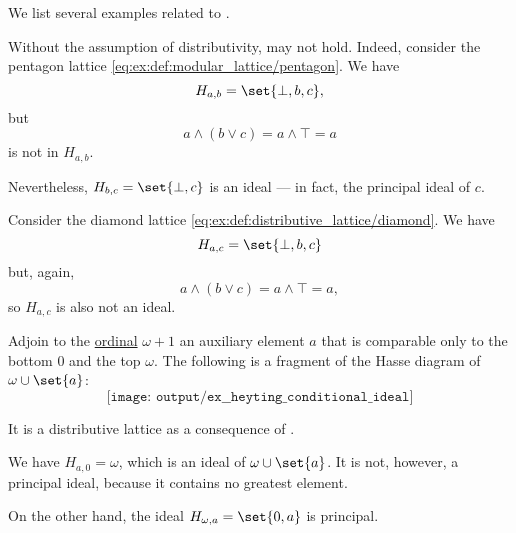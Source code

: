 \begin{example}\label{ex:heyting_conditional_ideal}
  We list several examples related to .

  \begin{thmenum}
     Without the assumption of distributivity,  may not hold. Indeed, consider the pentagon lattice \eqref{eq:ex:def:modular_lattice/pentagon}. We have
    \begin{equation*}
      H_{a,b} = \set{ \bot, b, c },
    \end{equation*}
    but
    \begin{equation*}
      a \wedge (b \vee c) = a \wedge \top = a
    \end{equation*}
    is not in \( H_{a,b} \).

    Nevertheless, \( H_{b,c} = \set{ \bot, c } \) is an ideal --- in fact, the principal ideal of \( c \).

     Consider the diamond lattice \eqref{eq:ex:def:distributive_lattice/diamond}. We have
    \begin{equation*}
      H_{a,c} = \set{ \bot, b, c }
    \end{equation*}
    but, again,
    \begin{equation*}
      a \wedge (b \vee c) = a \wedge \top = a,
    \end{equation*}
    so \( H_{a,c} \) is also not an ideal.

     Adjoin to the \hyperref[def:ordinal]{ordinal} \( \omega + 1 \) an auxiliary element \( a \) that is comparable only to the bottom \( 0 \) and the top \( \omega \). The following is a fragment of the Hasse diagram of \( \omega \cup \set{ a } \):
    \begin{equation*}
      \texttt{[image: output/ex\_\_heyting\_conditional\_ideal]}
    \end{equation*}

    It is a distributive lattice as a consequence of .

    We have \( H_{a,0} = \omega \), which is an ideal of \( \omega \cup \set{ a } \). It is not, however, a principal ideal, because it contains no greatest element.

    On the other hand, the ideal \( H_{\omega,a} = \set{ 0, a } \) is principal.
  \end{thmenum}
\end{example}

